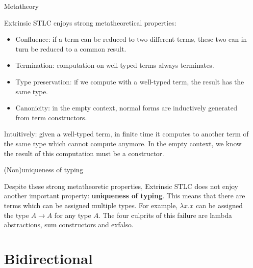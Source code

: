\documentclass{beamer}
\newcommand{\Fun}[2]{#1 \to #2}
\newcommand{\fun}[2]{\lambda #1. #2}
\begin{document}
\begin{frame}{Metatheory}

Extrinsic STLC enjoys strong metatheoretical properties:

\begin{itemize}
  \item Confluence: if a term can be reduced to two different terms, these two can in turn be reduced to a common result.
  \item Termination: computation on well-typed terms always terminates.
  \item Type preservation: if we compute with a well-typed term, the result has the same type.
  \item Canonicity: in the empty context, normal forms are inductively generated from term constructors.
\end{itemize}

\vspace{1em}

Intuitively: given a well-typed term, in finite time it computes to another term of the same type which cannot compute anymore. In the empty context, we know the result of this computation must be a constructor.

\end{frame}

\begin{frame}{(Non)uniqueness of typing}

Despite these strong metatheoretic properties, Extrinsic STLC does not enjoy another important property: \textbf{uniqueness of typing}. This means that there are terms which can be assigned multiple types. For example, $\fun{x}{x}$ can be assigned the type $\Fun{A}{A}$ for any type $A$. The four culprits of this failure are lambda abstractions, sum constructors and exfalso.

\end{frame}

\section{Bidirectional}

\newcommand{\newterm}[1]{\mathcolor{green}{#1}}

\newcommand{\fullcheck}[3]{#1 \vdash #2 \mathcolor{blue}{\Leftarrow} #3}
\renewcommand{\check}[2]{\fullcheck{\Gamma}{#1}{#2}}

\newcommand{\fullinfer}[3]{#1 \vdash #2 \mathcolor{red}{\Rightarrow} #3}
\newcommand{\infer}[2]{\fullinfer{\Gamma}{#1}{#2}}
\end{document}
